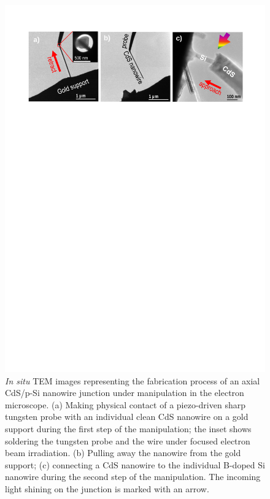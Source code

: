 \begin{figure}  
\includegraphics[width=\textwidth]{figures/figure3_1}
\caption[Making an axial junction.]{\textit{In situ} TEM images representing the fabrication process of an axial CdS/p-Si nanowire junction under manipulation in the electron microscope. (a) Making physical contact of a piezo-driven sharp tungsten probe with an individual clean CdS nanowire on a gold support during the first step of the manipulation; the inset shows soldering the tungsten probe and the wire under focused electron beam irradiation. (b) Pulling away the nanowire from the gold support; (c) connecting a CdS nanowire to the individual B-doped Si nanowire during the second step of the manipulation. The incoming light shining on the junction is marked with an arrow.
\label{fig:fig3_1}}
\end{figure}

